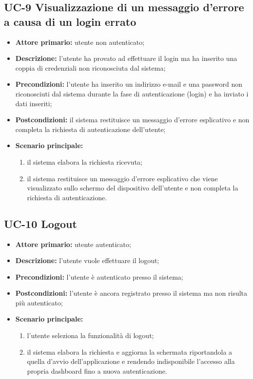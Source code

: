 \subsection{UC-9 Visualizzazione di un messaggio d'errore a causa di un login errato}
\begin{itemize}
	\item \textbf{Attore primario:} utente non autenticato;

	\item \textbf{Descrizione:} l'utente ha provato ad effettuare il login ma ha inserito una coppia di credenziali non riconosciuta dal sistema;

	\item \textbf{Precondizioni:} l'utente ha inserito un indirizzo e-mail e una password non riconosciuti dal sistema durante la fase di autenticazione (login) e ha inviato i dati inseriti;

	\item \textbf{Postcondizioni:} il sistema restituisce un messaggio d'errore esplicativo e non completa la richiesta di autenticazione dell'utente;

	\item \textbf{Scenario principale:}

	      \begin{enumerate}
		      \item il sistema elabora la richiesta ricevuta;
		      \item il sistema restituisce un messaggio d'errore esplicativo che viene visualizzato sullo schermo del dispositivo dell'utente e non completa la richiesta di autenticazione.
	      \end{enumerate}
\end{itemize}
\subsection{UC-10 Logout}
\begin{itemize}
	\item \textbf{Attore primario:} utente autenticato;

	\item \textbf{Descrizione:} l'utente vuole effettuare il logout;

	\item \textbf{Precondizioni:} l'utente è autenticato presso il sistema;

	\item \textbf{Postcondizioni:} l'utente è ancora registrato presso il sistema ma non risulta più autenticato;

	\item \textbf{Scenario principale:}

	      \begin{enumerate}
		      \item l'utente seleziona la funzionalità di logout;
		      \item il sistema elabora la richiesta e aggiorna la schermata riportandola a quella d'avvio dell'applicazione e rendendo indisponibile l'accesso alla propria dashboard fino a nuova autenticazione.
	      \end{enumerate}
\end{itemize}
